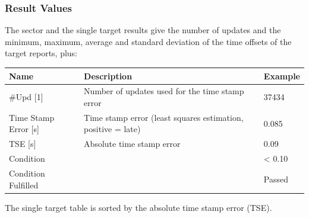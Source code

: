 \subsubsection{Result Values}

The sector and the single target results give the number of updates and the minimum, maximum, average and
standard deviation of the time offsets of the target reports, plus:

\begin{center}
 \begin{table}[H]
  \begin{tabularx}{\textwidth}{ | l | X |  l | }
    \hline
    \textbf{Name} & \textbf{Description} & \textbf{Example} \\ \hline
    \#Upd [1] & Number of updates used for the time stamp error & 37434 \\ \hline
    Time Stamp Error [s] & Time stamp error (least squares estimation, positive = late) & 0.085 \\ \hline
    TSE [s] & Absolute time stamp error & 0.09 \\ \hline
    Condition &  & < 0.10 \\ \hline
    Condition Fulfilled &  & Passed \\ \hline
\end{tabularx}
\end{table}
\end{center}

The single target table is sorted by the absolute time stamp error (TSE).

